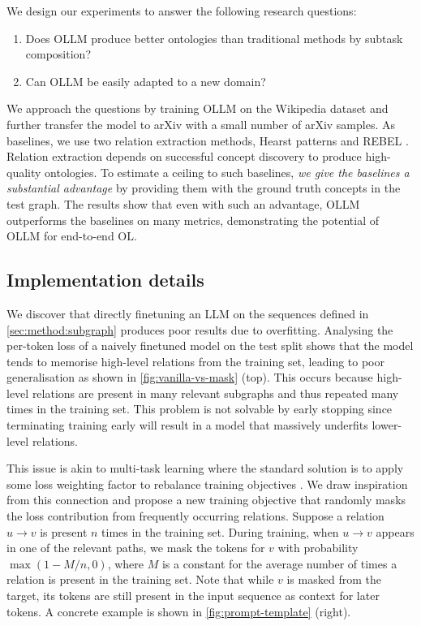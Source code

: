 \documentclass{article}
\newcommand{\name}{{OLLM}\xspace}
\begin{document}
We design our experiments to answer the following research questions:
\begin{enumerate}
    \item Does \name produce better ontologies than traditional methods by subtask composition?
    \item Can \name be easily adapted to a new domain?
\end{enumerate}
We approach the questions by training \name on the Wikipedia dataset and further transfer the model to arXiv with a small number of arXiv samples. As baselines, we use two relation extraction methods, Hearst patterns \cite{hearst1998automated,roller2018hearst} and REBEL \cite{cabot2021rebel}. Relation extraction depends on successful concept discovery to produce high-quality ontologies. To estimate a ceiling to such baselines, \emph{we give the baselines a substantial advantage} by providing them with the ground truth concepts in the test graph. The results show that even with such an advantage, \name outperforms the baselines on many metrics, demonstrating the potential of \name for end-to-end OL.

\subsection{Implementation details}  \label{sec:implementation}





We discover that directly finetuning an LLM on the sequences defined in \cref{sec:method:subgraph} produces poor results due to overfitting. Analysing the per-token loss of a naively finetuned model on the test split shows that the model tends to memorise high-level relations from the training set, leading to poor generalisation as shown in \cref{fig:vanilla-vs-mask} (top). This occurs because high-level relations are present in many relevant subgraphs and thus repeated many times in the training set. This problem is not solvable by early stopping since terminating training early will result in a model that massively underfits lower-level relations.

This issue is akin to multi-task learning \cite{caruana1997multitask} where the standard solution is to apply some loss weighting factor to rebalance training objectives \cite{sermanet2013overfeat,kendall2018multi}. We draw inspiration from this connection and propose a new training objective that randomly masks the loss contribution from frequently occurring relations. Suppose a relation $u \to v$ is present $n$ times in the training set. During training, when $u \to v$ appears in one of the relevant paths, we mask the tokens for $v$ with probability $\max(1 - M/n, 0)$, where $M$ is a constant for the average number of times a relation is present in the training set. Note that while $v$ is masked from the target, its tokens are still present in the input sequence as context for later tokens. A concrete example is shown in \cref{fig:prompt-template} (right).
\end{document}
